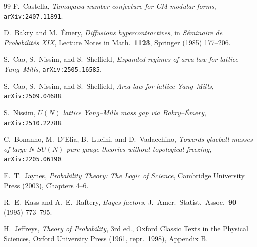 \documentclass[aps,prl,reprint,superscriptaddress,floatfix,nofootinbib,amssymb]{revtex4-2}
\theoremstyle{definition}
\theoremstyle{remark}
\begin{document}
\begin{thebibliography}{99}
F.~Castella,
\emph{Tamagawa number conjecture for CM modular forms},
\texttt{arXiv:2407.11891}.

D.~Bakry and M.~\'Emery,
\emph{Diffusions hypercontractives}, in \emph{S\'eminaire de
Probabilit\'es XIX}, Lecture Notes in Math.~\textbf{1123}, Springer
(1985) 177--206.

S.~Cao, S.~Nissim, and S.~Sheffield,
\emph{Expanded regimes of area law for lattice Yang--Mills},
\texttt{arXiv:2505.16585}.

S.~Cao, S.~Nissim, and S.~Sheffield,
\emph{Area law for lattice Yang--Mills},
\texttt{arXiv:2509.04688}.

S.~Nissim,
\emph{$U(N)$ lattice Yang--Mills mass gap via Bakry--\'Emery},
\texttt{arXiv:2510.22788}.

C.~Bonanno, M.~D'Elia, B.~Lucini, and D.~Vadacchino,
\emph{Towards glueball masses of large-$N$ $SU(N)$ pure-gauge
theories without topological freezing},
\texttt{arXiv:2205.06190}.

E.~T.~Jaynes,
\emph{Probability Theory: The Logic of Science},
Cambridge University Press (2003), Chapters 4--6.

R.~E.~Kass and A.~E.~Raftery,
\emph{Bayes factors},
J.~Amer.~Statist.~Assoc.~\textbf{90} (1995) 773--795.

H.~Jeffreys,
\emph{Theory of Probability}, 3rd ed., Oxford Classic Texts in the
Physical Sciences, Oxford University Press (1961, repr.~1998),
Appendix B.

\end{thebibliography}
\end{document}
